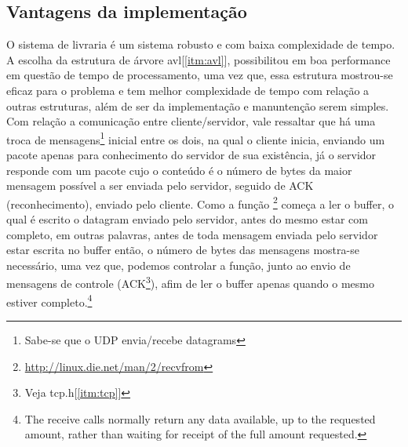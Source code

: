 \documentclass[a4paper,10pt]{article}
\begin{document}
\subsection{Vantagens da implementação}
O sistema de livraria é um sistema robusto e com baixa complexidade de tempo.
A escolha da estrutura de árvore avl[\ref{itm:avl}], possibilitou em boa 
performance em questão de tempo de processamento, uma vez que, essa estrutura
mostrou-se eficaz para o problema e tem melhor complexidade de tempo com 
relação a outras estruturas, além de ser da implementação e manuntenção serem
simples.
\\ Com relação a comunicação entre cliente/servidor, vale ressaltar que há uma troca de mensagens\footnote{Sabe-se que o UDP envia/recebe datagrams} inicial entre os dois, na qual o cliente inicia, enviando um pacote apenas para conhecimento do servidor de sua existência, já o servidor responde com um pacote cujo o conteúdo é o número de bytes da maior mensagem possível a ser enviada pelo servidor, seguido de ACK (reconhecimento), enviado pelo cliente.
Como a função \footnote{\url{http://linux.die.net/man/2/recvfrom}} começa a ler o buffer, o qual é escrito o datagram enviado pelo servidor, antes do mesmo estar com completo, em outras palavras, antes de toda mensagem enviada pelo servidor estar escrita no buffer então, o número de bytes das mensagens mostra-se necessário, uma vez que, podemos controlar a função, junto ao envio de mensagens de controle (ACK\footnote{Veja tcp.h[\ref{itm:tcp}]}), afim de ler o buffer apenas quando o mesmo estiver completo.\footnote{The receive calls normally return any data available, up to the requested amount, rather than waiting for receipt of the full amount requested.}
\newpage
\end{document}
